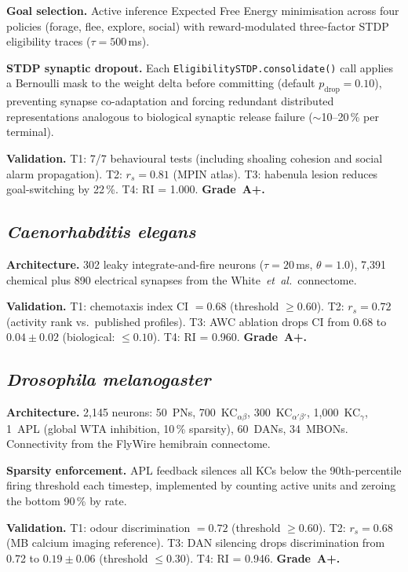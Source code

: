 \documentclass[11pt,a4paper]{article}
\begin{document}
\textbf{Goal selection.}
Active inference Expected Free Energy minimisation across four
policies (forage, flee, explore, social) with reward-modulated
three-factor STDP eligibility traces ($\tau = 500$\,ms).

\textbf{STDP synaptic dropout.}
Each \texttt{EligibilitySTDP.consolidate()} call applies a Bernoulli
mask to the weight delta before committing (default $p_\text{drop} =
0.10$), preventing synapse co-adaptation and forcing redundant
distributed representations analogous to biological synaptic release
failure ($\sim$10--20\,\% per terminal).

\textbf{Validation.}
T1: 7/7 behavioural tests (including shoaling cohesion and social
alarm propagation).
T2: $r_s = 0.81$ (MPIN atlas).
T3: habenula lesion reduces goal-switching by 22\,\%.
T4: RI = 1.000.
\textbf{Grade~A+.}

\subsection{\textit{Caenorhabditis elegans}}

\textbf{Architecture.}
302 leaky integrate-and-fire neurons ($\tau = 20$\,ms,
$\theta = 1.0$), 7,391 chemical plus 890 electrical synapses from
the White~\textit{et~al.}\ connectome.

\textbf{Validation.}
T1: chemotaxis index CI $= 0.68$ (threshold $\geq 0.60$).
T2: $r_s = 0.72$ (activity rank vs.\ published profiles).
T3: AWC ablation drops CI from 0.68 to $0.04 \pm 0.02$ (biological:
$\leq 0.10$).
T4: RI = 0.960.
\textbf{Grade~A+.}

\subsection{\textit{Drosophila melanogaster}}

\textbf{Architecture.}
2,145 neurons: 50~PNs, 700~KC$_{\alpha\beta}$, 300~KC$_{\alpha'\beta'}$,
1,000~KC$_\gamma$, 1~APL (global WTA inhibition, 10\,\% sparsity),
60~DANs, 34~MBONs.
Connectivity from the FlyWire hemibrain connectome.

\textbf{Sparsity enforcement.}
APL feedback silences all KCs below the 90th-percentile firing
threshold each timestep, implemented by counting active units and
zeroing the bottom 90\,\% by rate.

\textbf{Validation.}
T1: odour discrimination $= 0.72$ (threshold $\geq 0.60$).
T2: $r_s = 0.68$ (MB calcium imaging reference).
T3: DAN silencing drops discrimination from 0.72 to
$0.19 \pm 0.06$ (threshold $\leq 0.30$).
T4: RI = 0.946.
\textbf{Grade~A+.}
\end{document}
